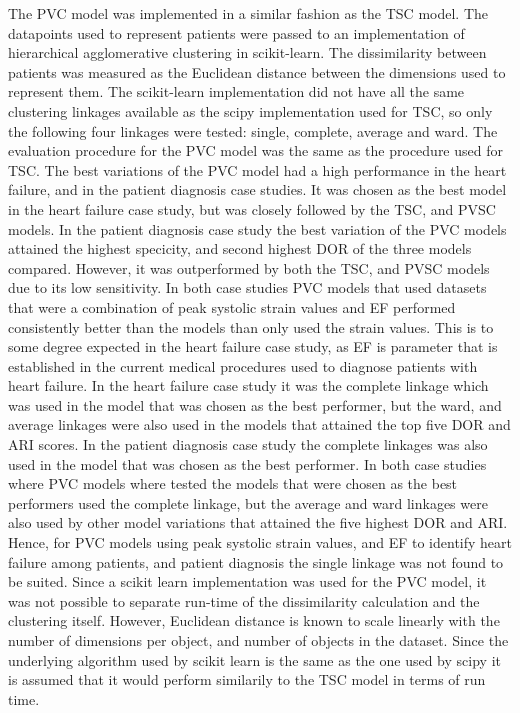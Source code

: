 The PVC model was implemented in a similar fashion as the TSC model.
The datapoints used to represent patients were passed to an implementation of hierarchical agglomerative clustering in scikit-learn. The dissimilarity between patients was measured as the Euclidean distance between the dimensions used to represent them. The scikit-learn implementation did not have all the same clustering linkages available as the scipy implementation used for TSC, so only the following four linkages were tested: single, complete, average and ward. The evaluation procedure for the PVC model was the same as the procedure used for TSC.
The best variations of the PVC model had a high performance in the heart failure, and in the patient diagnosis case studies. It was chosen as the best model in the heart failure case study, but was closely followed by the TSC, and PVSC models. In the patient diagnosis case study the best variation of the PVC models attained the highest specicity, and second highest DOR of the three models compared. However, it was outperformed by both the TSC, and PVSC models due to its low sensitivity.
In both case studies PVC models that used datasets that were a combination of peak systolic strain values and EF performed consistently better than the models than only used the strain values. This is to some degree expected in the heart failure case study, as EF is parameter that is established in the current medical procedures used to diagnose patients with heart failure.
In the heart failure case study it was the complete linkage which was used in the model that was chosen as the best performer, but the ward, and average linkages were also used in the models that attained the top five DOR and ARI scores. In the patient diagnosis case study the complete linkages was also used in the model that was chosen as the best performer. In both case studies where PVC models where tested the models that were chosen as the best performers used the complete linkage, but the average and ward linkages were also used by other model variations that attained the five highest DOR and ARI. Hence, for PVC models using peak systolic strain values, and EF to identify heart failure among patients, and patient diagnosis the single linkage was not found to be suited.
Since a scikit learn implementation was used for the PVC model, it was not possible to separate run-time of the dissimilarity calculation and the clustering itself. However, Euclidean distance is known to scale linearly with the number of dimensions per object, and number of objects in the dataset. Since the underlying algorithm used by scikit learn is the same as the one used by scipy it is assumed that it would perform similarily to the TSC model in terms of run time.

